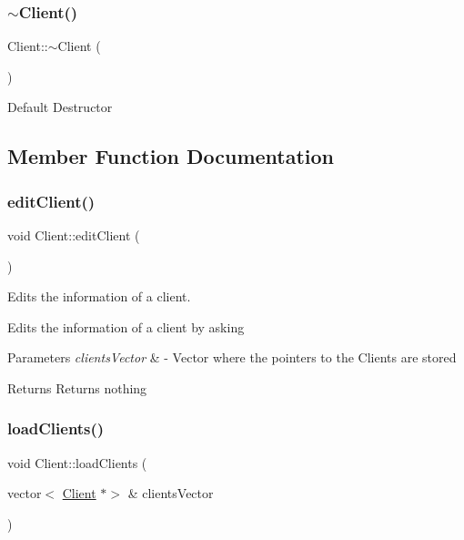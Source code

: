 \subsubsection{\texorpdfstring{$\sim$\+Client()}{~Client()}}
{\footnotesize\ttfamily Client\+::$\sim$\+Client (\begin{DoxyParamCaption}{ }\end{DoxyParamCaption})\hspace{0.3cm}{\ttfamily [virtual]}}

Default Destructor 

\subsection{Member Function Documentation}
\mbox{\label{class_client_afe8b004559fd1480fb8747c352f167db}} 
\subsubsection{\texorpdfstring{edit\+Client()}{editClient()}}
{\footnotesize\ttfamily void Client\+::edit\+Client (\begin{DoxyParamCaption}{ }\end{DoxyParamCaption})}



Edits the information of a client. 

Edits the information of a client by asking


\begin{DoxyParams}{Parameters}
{\em clients\+Vector} & -\/ Vector where the pointers to the Clients are stored \\
\hline
\end{DoxyParams}
\begin{DoxyReturn}{Returns}
Returns nothing 
\end{DoxyReturn}
\mbox{\label{class_client_ac18a40ed6975665b7f7661c8dcf7bf1b}} 
\subsubsection{\texorpdfstring{load\+Clients()}{loadClients()}}
{\footnotesize\ttfamily void Client\+::load\+Clients (\begin{DoxyParamCaption}\item[{vector$<$ \hyperlink{class_client}{Client} $\ast$$>$ \&}]{clients\+Vector }\end{DoxyParamCaption})\hspace{0.3cm}{\ttfamily [static]}}



